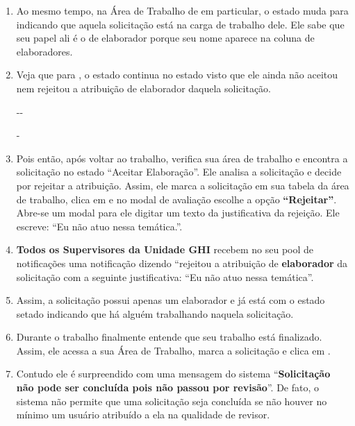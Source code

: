 \begin{landscape}
\begin{enumerate}
	{}{\ED}{-}{Indefinido}

	\item Ao mesmo tempo, na Área de Trabalho de \ED em particular, o estado muda para  indicando que aquela solicitação está na carga de trabalho dele. Ele sabe que seu papel ali é o de elaborador porque seu nome aparece na coluna de elaboradores.
	 
	 
	\item Veja que para \EU, o estado continua no estado  visto que ele ainda não aceitou nem rejeitou a atribuição de elaborador daquela solicitação.

	{}{-}{-}{\EU}

	{}{\ED}{-}{\ED}
	
	\item Pois então, após voltar ao trabalho, \EU verifica sua área de trabalho e encontra a solicitação no estado  ``Aceitar Elaboração''. Ele analisa a solicitação e decide por rejeitar a atribuição. Assim, ele marca a solicitação em sua tabela da área de trabalho, clica em \bAvaliar e no modal de avaliação escolhe a opção \textbf{``Rejeitar''}. Abre-se um modal para ele digitar um texto da justificativa da rejeição. Ele escreve: ``Eu não atuo nessa temática.''.
	
	\item \textbf{Todos os Supervisores da Unidade GHI} recebem no seu pool de notificações uma notificação dizendo ``\EU rejeitou a atribuição de \textbf{elaborador} da solicitação \SOLU com a seguinte justificativa: ``Eu não atuo nessa temática''.
	
	\item Assim, a solicitação \SOLU possui apenas um elaborador e já está com o estado  setado indicando que há alguém trabalhando naquela solicitação.
	
	\item Durante o trabalho \ED finalmente entende que seu trabalho está finalizado. Assim, ele acessa a sua Área de Trabalho, marca a solicitação e clica em \bConcluir.
	
	\item Contudo ele é surpreendido com uma mensagem do sistema ``\textbf{Solicitação não pode ser concluída pois não passou por revisão}''. De fato, o sistema não permite que uma solicitação seja concluída se não houver no mínimo um usuário atribuído a ela na qualidade de revisor.
	

\end{enumerate}
\end{landscape}

